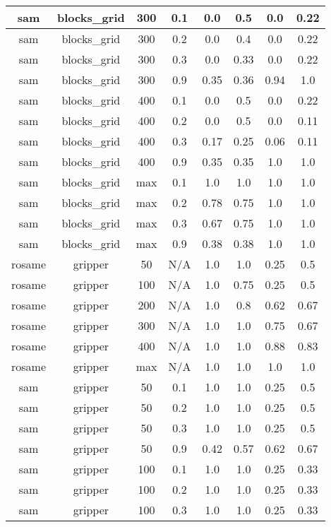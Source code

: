 \begin{table}[ht]
\begin{tabular}{c|c|c|c|c|c|c|c}
sam & blocks_grid & 300 & 0.1 & 0.0 & 0.5 & 0.0 & 0.22 \\ \hline
sam & blocks_grid & 300 & 0.2 & 0.0 & 0.4 & 0.0 & 0.22 \\ \hline
sam & blocks_grid & 300 & 0.3 & 0.0 & 0.33 & 0.0 & 0.22 \\ \hline
sam & blocks_grid & 300 & 0.9 & 0.35 & 0.36 & 0.94 & 1.0 \\ \hline
sam & blocks_grid & 400 & 0.1 & 0.0 & 0.5 & 0.0 & 0.22 \\ \hline
sam & blocks_grid & 400 & 0.2 & 0.0 & 0.5 & 0.0 & 0.11 \\ \hline
sam & blocks_grid & 400 & 0.3 & 0.17 & 0.25 & 0.06 & 0.11 \\ \hline
sam & blocks_grid & 400 & 0.9 & 0.35 & 0.35 & 1.0 & 1.0 \\ \hline
sam & blocks_grid & max & 0.1 & 1.0 & 1.0 & 1.0 & 1.0 \\ \hline
sam & blocks_grid & max & 0.2 & 0.78 & 0.75 & 1.0 & 1.0 \\ \hline
sam & blocks_grid & max & 0.3 & 0.67 & 0.75 & 1.0 & 1.0 \\ \hline
sam & blocks_grid & max & 0.9 & 0.38 & 0.38 & 1.0 & 1.0 \\ \hline
rosame & gripper & 50 & N/A & 1.0 & 1.0 & 0.25 & 0.5 \\ \hline
rosame & gripper & 100 & N/A & 1.0 & 0.75 & 0.25 & 0.5 \\ \hline
rosame & gripper & 200 & N/A & 1.0 & 0.8 & 0.62 & 0.67 \\ \hline
rosame & gripper & 300 & N/A & 1.0 & 1.0 & 0.75 & 0.67 \\ \hline
rosame & gripper & 400 & N/A & 1.0 & 1.0 & 0.88 & 0.83 \\ \hline
rosame & gripper & max & N/A & 1.0 & 1.0 & 1.0 & 1.0 \\ \hline
sam & gripper & 50 & 0.1 & 1.0 & 1.0 & 0.25 & 0.5 \\ \hline
sam & gripper & 50 & 0.2 & 1.0 & 1.0 & 0.25 & 0.5 \\ \hline
sam & gripper & 50 & 0.3 & 1.0 & 1.0 & 0.25 & 0.5 \\ \hline
sam & gripper & 50 & 0.9 & 0.42 & 0.57 & 0.62 & 0.67 \\ \hline
sam & gripper & 100 & 0.1 & 1.0 & 1.0 & 0.25 & 0.33 \\ \hline
sam & gripper & 100 & 0.2 & 1.0 & 1.0 & 0.25 & 0.33 \\ \hline
sam & gripper & 100 & 0.3 & 1.0 & 1.0 & 0.25 & 0.33 \\ \hline

\end{tabular}
\end{table}
